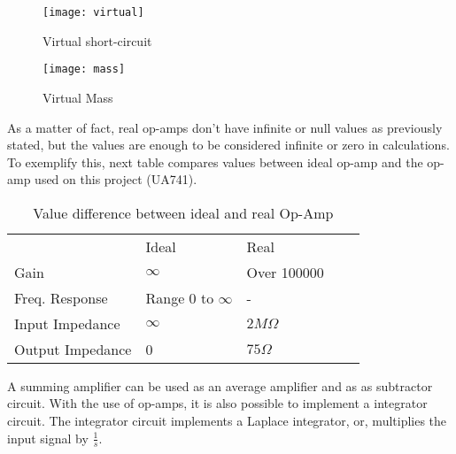 \documentclass[journal]{IEEEtran}
\begin{document}
        \begin{figure}[ht]
            \centering
            \texttt{[image: virtual]}
            \caption{Virtual short-circuit}
            \label{fig:virtual}
        \end{figure}
        \begin{figure}[ht]
            \centering
            \texttt{[image: mass]}
            \caption{Virtual Mass}
            \label{fig:mass}
        \end{figure}
        As a matter of fact, real op-amps don't have infinite or null values as previously stated, but the values are enough to be considered infinite or zero in calculations. To exemplify this, next table compares values between ideal op-amp and the op-amp used on this project (UA741).
        \begin{table}[h]
            \centering
            \caption{Value difference between ideal and real Op-Amp\cite{amp-op-real}}
            \label{table:amp_op_comp}
            \begin{tabular}{lllll}
                                 & Ideal          & Real        &  & \\
                Gain             & $\infty$       & Over 100000 &  &  \\
                Freq. Response   & Range $ 0$ to $\infty $ & -           &  &  \\
                Input Impedance  & $\infty$       & $2M\Omega $ &  &  \\
                Output Impedance & 0              & $75\Omega $ &  & 
            \end{tabular}
        \end{table}
        \par A summing amplifier can be used as an average amplifier and as as subtractor circuit\cite{summing_amp}. With the use of op-amps, it is also possible to implement a integrator circuit. The integrator circuit implements a Laplace integrator, or, multiplies the input signal by $\frac{1}{s}$\cite{laplace-quote}.
\end{document}
